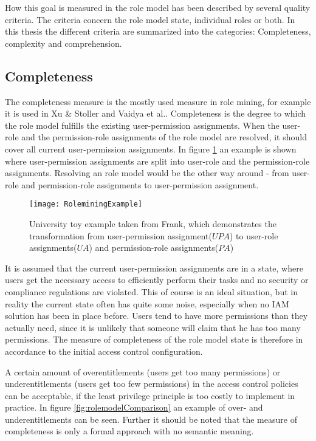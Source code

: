     How this goal is measured in the role model has been described by several quality criteria\cite{Kunz}\cite{Frank}. The criteria concern the role model state, individual roles or both. In this thesis the different criteria are summarized into the categories: Completeness, complexity and comprehension.
    
        \subsection{Completeness}
        \label{sec:completeness}
        The completeness measure is the mostly used measure in role mining\cite{Kunz}, for example it is used in Xu \& Stoller\cite{Xu} and Vaidya et al.\cite{Vaidya:2006}. Completeness is the degree to which the role model fulfills the existing user-permission assignments. When the user-role and the permission-role assignments of the role model are resolved, it should cover all current user-permission assignments. In figure \ref{fig:roleminingExample} an example is shown where user-permission assignments are split into user-role and the permission-role assignments. Resolving an role model would be the other way around - from user-role and permission-role assignments to user-permission assignment.
        
        \begin{figure}[H]
            \centering
            \texttt{[image: RoleminingExample]}
            \caption{University toy example taken from Frank\cite{roleMiningExample}, which demonstrates the transformation from user-permission assignment($UPA$) to user-role assignments($UA$) and permission-role assignments($PA$)}
            \label{fig:roleminingExample}
        \end{figure}
        
        It is assumed that the current user-permission assignments are in a state, where users get the necessary access to efficiently perform their tasks and no security or compliance regulations are violated. This of course is an ideal situation, but in reality the current state often has quite some noise, especially when no IAM solution has been in place before. Users tend to have more permissions than they actually need, since it is unlikely that someone will claim that he has too many permissions. The measure of completeness of the role model state is therefore in accordance to the initial access control configuration.
        
        A certain amount of overentitlements (users get too many permissions) or underentitlements (users get too few permissions) in the access control policies can be acceptable, if the least privilege principle is too costly to implement in practice. In figure \ref{fig:rolemodelComparison} an example of over- and underentitlements can be seen. Further it should be noted that the measure of completeness is only a formal approach with no semantic meaning.
        
